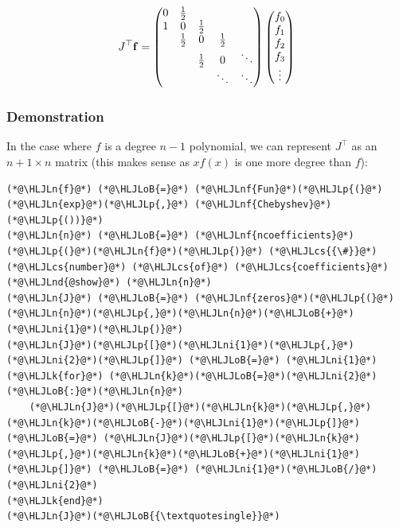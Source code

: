 \documentclass[12pt,a4paper]{article}
\newcommand{\HLJLk}[1]{\textcolor[RGB]{148,91,176}{\textbf{#1}}}
\newcommand{\HLJLn}[1]{#1}
\newcommand{\HLJLnd}[1]{\textcolor[RGB]{214,102,97}{#1}}
\newcommand{\HLJLnf}[1]{\textcolor[RGB]{66,102,213}{#1}}
\newcommand{\HLJLni}[1]{\textcolor[RGB]{59,151,46}{#1}}
\newcommand{\HLJLoB}[1]{\textcolor[RGB]{102,102,102}{\textbf{#1}}}
\newcommand{\HLJLp}[1]{#1}
\newcommand{\HLJLcs}[1]{\textcolor[RGB]{153,153,119}{\textit{#1}}}
\begin{document}
\[
J^\top \mathbf{f} = \begin{pmatrix}
0 & {1\over 2} \cr
1 & 0 & {1\over 2} \cr
& {1\over 2} & 0 & {1\over 2} \cr
&& {1\over 2} & 0 & \ddots \cr
&&&\ddots & \ddots
\end{pmatrix} \begin{pmatrix} f_0\\ f_1\\f_2\\f_3\\\vdots\end{pmatrix}
\]
\subsubsection{Demonstration}
In the case where $f$ is a degree $n-1$  polynomial, we can represent $J^\top$ as an $n+1 \times n$ matrix (this makes sense as $x f(x)$ is one more degree than $f$):


\begin{lstlisting}
(*@\HLJLn{f}@*) (*@\HLJLoB{=}@*) (*@\HLJLnf{Fun}@*)(*@\HLJLp{(}@*)(*@\HLJLn{exp}@*)(*@\HLJLp{,}@*) (*@\HLJLnf{Chebyshev}@*)(*@\HLJLp{())}@*)
(*@\HLJLn{n}@*) (*@\HLJLoB{=}@*) (*@\HLJLnf{ncoefficients}@*)(*@\HLJLp{(}@*)(*@\HLJLn{f}@*)(*@\HLJLp{)}@*) (*@\HLJLcs{{\#}}@*) (*@\HLJLcs{number}@*) (*@\HLJLcs{of}@*) (*@\HLJLcs{coefficients}@*)
(*@\HLJLnd{@show}@*) (*@\HLJLn{n}@*)
(*@\HLJLn{J}@*) (*@\HLJLoB{=}@*) (*@\HLJLnf{zeros}@*)(*@\HLJLp{(}@*)(*@\HLJLn{n}@*)(*@\HLJLp{,}@*)(*@\HLJLn{n}@*)(*@\HLJLoB{+}@*)(*@\HLJLni{1}@*)(*@\HLJLp{)}@*)
(*@\HLJLn{J}@*)(*@\HLJLp{[}@*)(*@\HLJLni{1}@*)(*@\HLJLp{,}@*)(*@\HLJLni{2}@*)(*@\HLJLp{]}@*) (*@\HLJLoB{=}@*) (*@\HLJLni{1}@*)
(*@\HLJLk{for}@*) (*@\HLJLn{k}@*)(*@\HLJLoB{=}@*)(*@\HLJLni{2}@*)(*@\HLJLoB{:}@*)(*@\HLJLn{n}@*)
    (*@\HLJLn{J}@*)(*@\HLJLp{[}@*)(*@\HLJLn{k}@*)(*@\HLJLp{,}@*)(*@\HLJLn{k}@*)(*@\HLJLoB{-}@*)(*@\HLJLni{1}@*)(*@\HLJLp{]}@*) (*@\HLJLoB{=}@*) (*@\HLJLn{J}@*)(*@\HLJLp{[}@*)(*@\HLJLn{k}@*)(*@\HLJLp{,}@*)(*@\HLJLn{k}@*)(*@\HLJLoB{+}@*)(*@\HLJLni{1}@*)(*@\HLJLp{]}@*) (*@\HLJLoB{=}@*) (*@\HLJLni{1}@*)(*@\HLJLoB{/}@*)(*@\HLJLni{2}@*)
(*@\HLJLk{end}@*)
(*@\HLJLn{J}@*)(*@\HLJLoB{{\textquotesingle}}@*)
\end{lstlisting}
\end{document}
